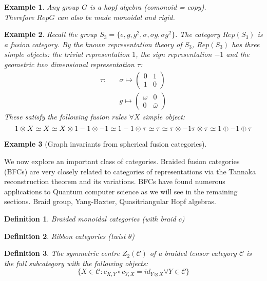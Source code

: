 \documentclass{article}
\newtheorem{definition}{Definition}
\newtheorem{example}{Example}
\begin{document}
	\begin{example}
		Any group $G$ is a hopf algebra (comonoid = copy).\\
		Therefore $RepG$ can also be made monoidal and rigid.
	\end{example}
	
	\begin{example}
		Recall the group $S_3=\{e, g, g^2, \sigma, \sigma g, \sigma g^2 \}$. The category $Rep(S_3)$ is a fusion category. By the known representation theory of $S_3$, $Rep(S_3)$ has three simple objects: the trivial representation $1$, the sign representation $-1$ and the geometric two dimensional representation $\tau$:
		\begin{equation*}
		\begin{split}
		\tau : \quad & \sigma \mapsto \left( {\begin{array}{cc} 0 & 1 \\ 1 & 0 \end{array}}\right) \\
		& g \mapsto \left( {\begin{array}{cc} \omega & 0 \\ 0 & \bar{\omega} \end{array}}\right)
		\end{split}
		\end{equation*}
		These satisfy the following fusion rules $\forall X$ simple object:
		\begin{equation}
		1 \otimes X \simeq X \simeq X \otimes 1\\
		-1 \otimes -1 \simeq 1\\
		-1 \otimes \tau \simeq \tau \simeq \tau \otimes -1\\
		\tau \otimes \tau \simeq 1 \oplus -1 \oplus \tau\\
		\end{equation}
		
	\end{example}
	
	\begin{example}[Graph invariants from spherical fusion categories]
	\end{example}
	
	We now explore an important class of categories. Braided fusion categories (BFCs) are very closely related to categories of representations via the Tannaka reconstruction theorem and its variations. BFCs have found numerous applications to Quantum computer science as we will see in the remaining sections.
	Braid group, Yang-Baxter, Quasitriangular Hopf algebras.
	\begin{definition}
		Braided monoidal categories (with braid $c$)
	\end{definition}
	\begin{definition}
		Ribbon categories (twist $\theta$)
	\end{definition}
	\begin{definition}
		The symmetric centre $Z_2(\mathcal{C})$ of a braided tensor category $\mathcal{C}$ is the full subcategory with the following objects:
		$$ \{ X \in \mathcal{C} : c_{X,Y} \circ c_{Y,X} = id_{Y\otimes X} \forall Y \in \mathcal{C} \} $$
	\end{definition}
	
\end{document}
